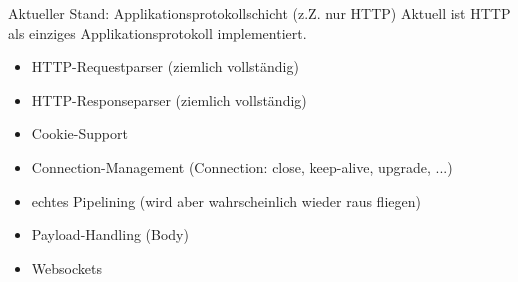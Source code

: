 \begin{frame}{Aktueller Stand: Applikationsprotokollschicht (z.Z. nur HTTP)}
  Aktuell ist HTTP als einziges Applikationsprotokoll implementiert.
  \begin{itemize}
    \item HTTP-\alert{Requestparser} (ziemlich vollständig)
    \item HTTP-\alert{Responseparser} (ziemlich vollständig)
    \item \alert{Cookie}-Support
    \item Connection-Management (Connection: close, keep-alive, upgrade, ...)
    \item echtes \alert{Pipelining} (wird aber wahrscheinlich wieder raus fliegen)
    \item \alert{Payload}-Handling (Body)
    \item \alert{Websockets}
  \end{itemize}
\end{frame}

